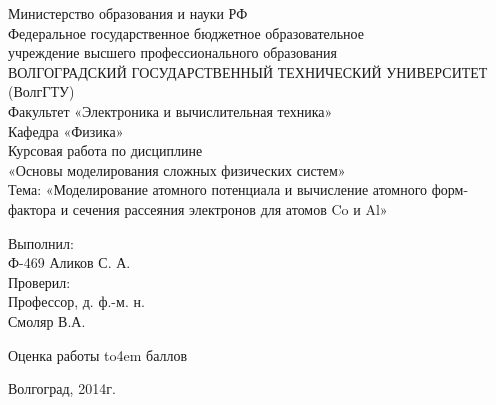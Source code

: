 \documentclass[a4paper,14pt]{extarticle} %
\begin{document}
\begin{titlepage} 
\vskip 6cm
\vskip 4cm
\begin{center}
Министерство образования и науки РФ\\
Федеральное государственное бюджетное образовательное\\
учреждение высшего профессионального образования\\
ВОЛГОГРАДСКИЙ ГОСУДАРСТВЕННЫЙ ТЕХНИЧЕСКИЙ УНИВЕРСИТЕТ\\
(ВолгГТУ)\\
Факультет «Электроника и вычислительная техника»\\
Кафедра «Физика»\\
\vskip 2cm
Курсовая работа по дисциплине \\
«Основы моделирования сложных физических систем»\\
Тема: «Моделирование атомного потенциала и вычисление атомного форм-фактора и сечения рассеяния электронов для атомов Co и Al»\\
\end{center}
\vskip 2cm
\begin{flushright}
\parbox{6cm}{
Выполнил:\\
Ф-469 Аликов С. А.\\
Проверил:\\
Профессор, д. ф.-м. н.\\
Смоляр В.А.\\}
\vskip 2cm
\end{flushright}
\begin{center}
\def\hrf#1{\hbox to#1{\hrulefill}}
Оценка работы \hrf{4em} баллов
\end{center}
\begin{center}
\vskip 3cm
Волгоград, 2014г.
\end{center}


\end{titlepage}
\end{document}
